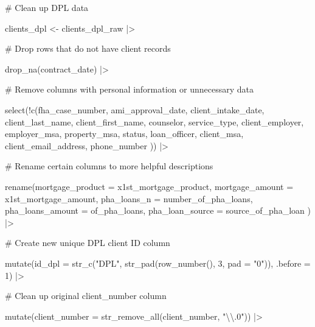 \documentclass[
  letterpaper,
  DIV=11,
  numbers=noendperiod]{scrartcl}
\newenvironment{Shaded}{\begin{snugshade}}{\end{snugshade}}
\newcommand{\AttributeTok}[1]{\textcolor[rgb]{0.40,0.45,0.13}{#1}}
\newcommand{\CommentTok}[1]{\textcolor[rgb]{0.37,0.37,0.37}{#1}}
\newcommand{\DecValTok}[1]{\textcolor[rgb]{0.68,0.00,0.00}{#1}}
\newcommand{\FunctionTok}[1]{\textcolor[rgb]{0.28,0.35,0.67}{#1}}
\newcommand{\NormalTok}[1]{\textcolor[rgb]{0.00,0.23,0.31}{#1}}
\newcommand{\OtherTok}[1]{\textcolor[rgb]{0.00,0.23,0.31}{#1}}
\newcommand{\SpecialCharTok}[1]{\textcolor[rgb]{0.37,0.37,0.37}{#1}}
\newcommand{\StringTok}[1]{\textcolor[rgb]{0.13,0.47,0.30}{#1}}
\begin{document}
\begin{Shaded}
\begin{Highlighting}[]
\CommentTok{\# Clean up DPL data}

\NormalTok{clients\_dpl }\OtherTok{\textless{}{-}}\NormalTok{ clients\_dpl\_raw }\SpecialCharTok{|\textgreater{}} 
  
  \CommentTok{\# Drop rows that do not have client records}
  
  \FunctionTok{drop\_na}\NormalTok{(contract\_date) }\SpecialCharTok{|\textgreater{}}
  
  \CommentTok{\# Remove columns with personal information or unnecessary data}
  
  \FunctionTok{select}\NormalTok{(}\SpecialCharTok{!}\FunctionTok{c}\NormalTok{(fha\_case\_number, ami\_approval\_date, client\_intake\_date,}
\NormalTok{            client\_last\_name, client\_first\_name, counselor,}
\NormalTok{            service\_type, client\_employer, employer\_msa,}
\NormalTok{            property\_msa, status, loan\_officer, client\_msa,}
\NormalTok{            client\_email\_address, phone\_number}
\NormalTok{            )) }\SpecialCharTok{|\textgreater{}} 
  
  \CommentTok{\# Rename certain columns to more helpful descriptions}
  
  \FunctionTok{rename}\NormalTok{(}\AttributeTok{mortgage\_product =}\NormalTok{ x1st\_mortgage\_product,}
         \AttributeTok{mortgage\_amount =}\NormalTok{ x1st\_mortgage\_amount,}
         \AttributeTok{pha\_loans\_n =}\NormalTok{ number\_of\_pha\_loans,}
         \AttributeTok{pha\_loans\_amount =}\NormalTok{ of\_pha\_loans,}
         \AttributeTok{pha\_loan\_source =}\NormalTok{ source\_of\_pha\_loan}
\NormalTok{         ) }\SpecialCharTok{|\textgreater{}} 
  
  \CommentTok{\# Create new unique DPL client ID column}
  
  \FunctionTok{mutate}\NormalTok{(}\AttributeTok{id\_dpl =} \FunctionTok{str\_c}\NormalTok{(}\StringTok{"DPL"}\NormalTok{, }\FunctionTok{str\_pad}\NormalTok{(}\FunctionTok{row\_number}\NormalTok{(), }\DecValTok{3}\NormalTok{, }\AttributeTok{pad =} \StringTok{"0"}\NormalTok{)),}
         \AttributeTok{.before =} \DecValTok{1}\NormalTok{) }\SpecialCharTok{|\textgreater{}} 
  
  \CommentTok{\# Clean up original client\_number column}
  
  \FunctionTok{mutate}\NormalTok{(}\AttributeTok{client\_number =} \FunctionTok{str\_remove\_all}\NormalTok{(client\_number, }\StringTok{"}\SpecialCharTok{\textbackslash{}\textbackslash{}}\StringTok{.0"}\NormalTok{)) }\SpecialCharTok{|\textgreater{}} 
  

\end{Highlighting}
\end{Shaded}
\end{document}
